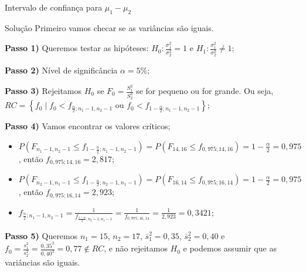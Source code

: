 \documentclass[9pt]{beamer}
\begin{document}
\begin{frame}{Intervalo de confiança para $\mu_1 - \mu_2$}

\begin{block}{Solução}
	Primeiro vamos checar se as variâncias são iguais.
	
	\textbf{Passo 1)} Queremos testar as hipóteses: $H_0: \frac{\sigma_1^2}{\sigma_2^2} = 1$ e $H_1: \frac{\sigma_1^2}{\sigma_2^2} \neq 1$;
	
	\textbf{Passo 2)} Nível de significância $\alpha=5\%$;
	
	\textbf{Passo 3)} Rejeitamos $H_0$ se $F_0 = \frac{S_1^2}{S_2^2}$ se for pequeno ou for grande. Ou seja, $RC = \left\{ f_0 \mid f_0 < f_{\frac{\alpha}{2}; n_1-1, n_2-1} \mbox{ ou } f_0 < f_{1-\frac{\alpha}{2}; n_1-1, n_2-1} \right\}$;
	
	\textbf{Passo 4)} Vamos encontrar os valores críticos;
	\begin{itemize}
		\item $P(F_{n_1-1, n_2-1} \leq f_{1-\frac{\alpha}{2}; n_1-1, n_2-1}) = P(F_{14, 16} \leq f_{0,975; 14, 16}) = 1 - \frac{\alpha}{2} = 0,975$, então $f_{0,975; 14, 16} = 2,817$;
		\item $P(F_{n_2-1, n_1-1} \leq f_{1-\frac{\alpha}{2}; n_2-1, n_1-1}) = P(F_{16, 14} \leq f_{0,975; 16, 14}) = 1 - \frac{\alpha}{2} = 0,975$, então $f_{0,975; 16, 14} = 2,923$;
		\item $f_{\frac{\alpha}{2}; n_1-1, n_2-1} = \frac{1}{f_{\frac{1-\alpha}{2}; n_2-1, n_1-1}} = \frac{1}{f_{0,975; 16, 14}} = \frac{1}{2,923} = 0,3421$;
	\end{itemize}

	\textbf{Passo 5)} Queremos $n_1=15$, $n_2=17$, $\bar{s}_1^2=0,35$, $\bar{s}_2^2 = 0,40$ e $f_0 = \frac{s_1^2}{s_2^2} = \frac{0,35^2}{0,40^2} = 0,77 \not\in RC$, e não rejeitamos $H_0$ e podemos assumir que as variâncias são iguais.
\end{block}

\end{frame}
\end{document}
